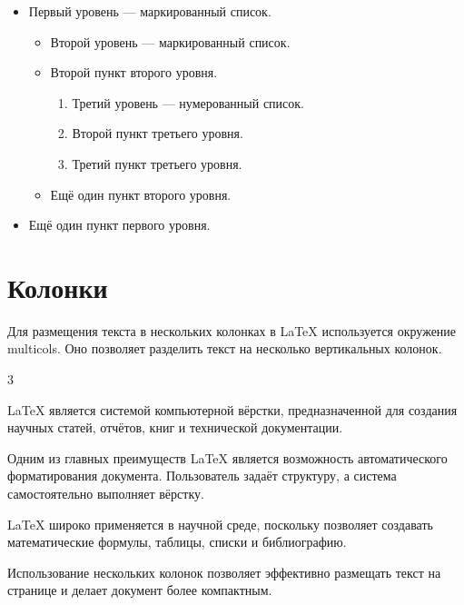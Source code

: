\documentclass[a4paper,14 pt]{article}
\begin{document}
\begin{itemize}
  \item Первый уровень — маркированный список.

    \begin{itemize}
      \item Второй уровень — маркированный список.
      \item Второй пункт второго уровня.

        \begin{enumerate}
          \item Третий уровень — нумерованный список.
          \item Второй пункт третьего уровня.
          \item Третий пункт третьего уровня.
        \end{enumerate}

      \item Ещё один пункт второго уровня.
    \end{itemize}

  \item Ещё один пункт первого уровня.
\end{itemize}




\section{Колонки}

Для размещения текста в нескольких колонках
в LaTeX используется окружение multicols.
Оно позволяет разделить текст на несколько
вертикальных колонок.

\begin{multicols}{3}

  LaTeX является системой компьютерной вёрстки,
  предназначенной для создания научных статей,
  отчётов, книг и технической документации.

  Одним из главных преимуществ LaTeX является
  возможность автоматического форматирования
  документа. Пользователь задаёт структуру,
  а система самостоятельно выполняет вёрстку.

  LaTeX широко применяется в научной среде,
  поскольку позволяет создавать математические
  формулы, таблицы, списки и библиографию.

  Использование нескольких колонок позволяет
  эффективно размещать текст на странице
  и делает документ более компактным.

\end{multicols}
\end{document}
